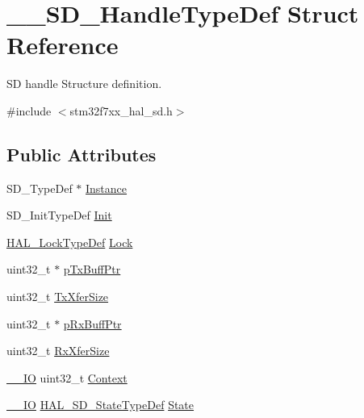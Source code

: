 \hypertarget{struct_____s_d___handle_type_def}{}\section{\+\_\+\+\_\+\+S\+D\+\_\+\+Handle\+Type\+Def Struct Reference}
\label{struct_____s_d___handle_type_def}


SD handle Structure definition.  




{\ttfamily \#include $<$stm32f7xx\+\_\+hal\+\_\+sd.\+h$>$}

\subsection*{Public Attributes}
\begin{DoxyCompactItemize}
\item 
S\+D\+\_\+\+Type\+Def $\ast$ \mbox{\hyperlink{struct_____s_d___handle_type_def_a8d4f713cf85df2d68bde47eaa446185a}{Instance}}
\item 
S\+D\+\_\+\+Init\+Type\+Def \mbox{\hyperlink{struct_____s_d___handle_type_def_a8a3234d14062797b9da64c0e5d51f297}{Init}}
\item 
\mbox{\hyperlink{stm32f7xx__hal__def_8h_ab367482e943333a1299294eadaad284b}{H\+A\+L\+\_\+\+Lock\+Type\+Def}} \mbox{\hyperlink{struct_____s_d___handle_type_def_a19ed38c1235ab962f4acd5249e71c922}{Lock}}
\item 
uint32\+\_\+t $\ast$ \mbox{\hyperlink{struct_____s_d___handle_type_def_afe1c03276647af1420746a2d3e91684b}{p\+Tx\+Buff\+Ptr}}
\item 
uint32\+\_\+t \mbox{\hyperlink{struct_____s_d___handle_type_def_a9440fde045121f2f0399b4d69b27a399}{Tx\+Xfer\+Size}}
\item 
uint32\+\_\+t $\ast$ \mbox{\hyperlink{struct_____s_d___handle_type_def_a3b9b28e9c1bb35f6b82ef742f371bf77}{p\+Rx\+Buff\+Ptr}}
\item 
uint32\+\_\+t \mbox{\hyperlink{struct_____s_d___handle_type_def_a38d1b0958a78b1d682a86420f2fc6312}{Rx\+Xfer\+Size}}
\item 
\mbox{\hyperlink{core__sc300_8h_aec43007d9998a0a0e01faede4133d6be}{\+\_\+\+\_\+\+IO}} uint32\+\_\+t \mbox{\hyperlink{struct_____s_d___handle_type_def_ad2fce54d0cd2a5b1d07e26407128d9c3}{Context}}
\item 
\mbox{\hyperlink{core__sc300_8h_aec43007d9998a0a0e01faede4133d6be}{\+\_\+\+\_\+\+IO}} \mbox{\hyperlink{group___s_d___exported___types___group1_ga0012126bcdfea270fe367bfaec2692ba}{H\+A\+L\+\_\+\+S\+D\+\_\+\+State\+Type\+Def}} \mbox{\hyperlink{struct_____s_d___handle_type_def_ababf20731e895a6374d13d967aabfb80}{State}}

\end{DoxyCompactItemize}
